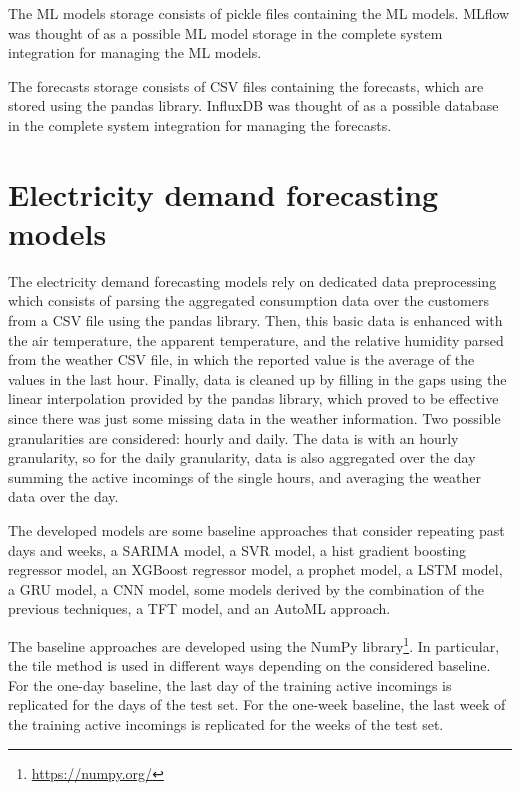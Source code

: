 The ML models storage consists of pickle files containing the ML models.
MLflow was thought of as a possible ML model storage in the complete system integration for managing the ML models.

The forecasts storage consists of CSV files containing the forecasts, which are stored using the pandas library.
InfluxDB was thought of as a possible database in the complete system integration for managing the forecasts.


\section{Electricity demand forecasting models}
\label{sec:demandimpl}
\vspace{0.2 cm}

The electricity demand forecasting models rely on dedicated data preprocessing which consists of parsing the aggregated consumption data over the customers from a CSV file using the pandas library.
Then, this basic data is enhanced with the air temperature, the apparent temperature, and the relative humidity parsed from the weather CSV file, in which the reported value is the average of the values in the last hour.
Finally, data is cleaned up by filling in the gaps using the linear interpolation provided by the pandas library, which proved to be effective since there was just some missing data in the weather information.
Two possible granularities are considered: hourly and daily.
The data is with an hourly granularity, so for the daily granularity, data is also aggregated over the day summing the active incomings of the single hours, and averaging the weather data over the day.

The developed models are some baseline approaches that consider repeating past days and weeks, a SARIMA model, a SVR model, a hist gradient boosting regressor model, an XGBoost regressor model, a prophet model, a LSTM model, a GRU model, a CNN model, some models derived by the combination of the previous techniques, a TFT model, and an AutoML approach.

The baseline approaches are developed using the NumPy library\footnote{ \url{https://numpy.org/} }.
In particular, the tile method is used in different ways depending on the considered baseline.
For the one-day baseline, the last day of the training active incomings is replicated for the days of the test set.
For the one-week baseline, the last week of the training active incomings is replicated for the weeks of the test set.

